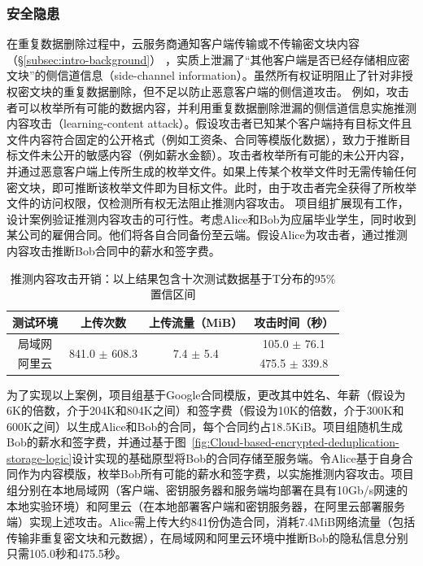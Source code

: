 \subsubsection{安全隐患} 
\label{subsec:intro-problem-security}

在重复数据删除过程中，云服务商通知客户端传输或不传输密文块内容（\S\ref{subsec:intro-background}） ，实质上泄漏了“其他客户端是否已经存储相应密文块”的侧信道信息（side-channel information）。虽然所有权证明阻止了针对非授权密文块的重复数据删除，但不足以防止恶意客户端的侧信道攻击。
例如，攻击者可以枚举所有可能的数据内容，并利用重复数据删除泄漏的侧信道信息实施推测内容攻击（learning-content attack）\cite{harnik10,zuo2018mitigating}。假设攻击者已知某个客户端持有目标文件且文件内容符合固定的公开格式（例如工资条、合同等模版化数据），致力于推断目标文件未公开的敏感内容（例如薪水金额）。攻击者枚举所有可能的未公开内容，并通过恶意客户端上传所生成的枚举文件。如果上传某个枚举文件时无需传输任何密文块，即可推断该枚举文件即为目标文件。此时，由于攻击者完全获得了所枚举文件的访问权限，仅检测所有权无法阻止推测内容攻击。
项目组扩展现有工作\cite{harnik10,zuo2018mitigating}，设计案例验证推测内容攻击的可行性。考虑Alice和Bob为应届毕业学生，同时收到某公司的雇佣合同。他们将各自合同备份至云端。假设Alice为攻击者，通过推测内容攻击推断Bob合同中的薪水和签字费。

\begin{table}[!htb]
    \small
    \centering
    \begin{tabular}{@{}cccc@{}}
    \toprule
    测试环境 & 上传次数                            & 上传流量（MiB）                       & 攻击时间（秒）        \\ \midrule
    局域网  & \multirow{2}{*}{841.0 $\pm$ 608.3} & \multirow{2}{*}{7.4 $\pm$ 5.4} & 105.0 $\pm$ 76.1 \\
    阿里云  &                                 &                                 & 475.5 $\pm$ 339.8 \\
    \bottomrule
    \end{tabular}
    \caption{推测内容攻击开销：以上结果包含十次测试数据基于T分布的95\%置信区间}
    \label{tab:intro-bottleneck}
\end{table}

为了实现以上案例，项目组基于Google合同模版\cite{google_offer}，更改其中姓名、年薪（假设为6K的倍数\cite{harnik10}，介于204K和804K之间）和签字费（假设为10K的倍数，介于300K和600K之间）以生成Alice和Bob的合同，每个合同约占18.5KiB。项目组随机生成Bob的薪水和签字费，并通过基于图~\ref{fig:Cloud-based-encrypted-deduplication-storage-logic}设计实现的基础原型将Bob的合同存储至服务端。令Alice基于自身合同作为内容模版，枚举Bob所有可能的薪水和签字费，以实施推测内容攻击。项目组分别在本地局域网（客户端、密钥服务器和服务端均部署在具有10Gb/s网速的本地实验环境）和阿里云（在本地部署客户端和密钥服务器，在阿里云部署服务端）实现上述攻击。Alice需上传大约841份伪造合同，消耗7.4MiB网络流量（包括传输非重复密文块和元数据），在局域网和阿里云环境中推断Bob的隐私信息分别只需105.0秒和475.5秒。

